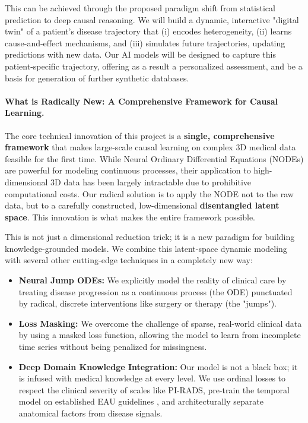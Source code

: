 \documentclass[11pt, a4paper]{article}
\begin{document}
This can be achieved through  the proposed paradigm shift from statistical prediction to deep causal reasoning. We will build a dynamic, interactive "digital twin" of a patient’s disease trajectory that (i) encodes heterogeneity, (ii) learns cause-and-effect mechanisms, and (iii) simulates future trajectories, updating predictions with new data. Our AI models will be designed to capture this patient-specific trajectory, offering as a result a personalized assessment, and be a basis for generation of further synthetic databases.


\paragraph{What is Radically New: A Comprehensive Framework for Causal Learning.}
The core technical innovation of this project is a \textbf{single, comprehensive framework} that makes large-scale causal learning on complex 3D medical data feasible for the first time. While Neural Ordinary Differential Equations (NODEs) are powerful for modeling continuous processes, their application to high-dimensional 3D data has been largely intractable due to prohibitive computational costs. Our radical solution is to apply the NODE not to the raw data, but to a carefully constructed, low-dimensional \textbf{disentangled latent space}. This innovation is what makes the entire framework possible.

This is not just a dimensional reduction trick; it is a new paradigm for building knowledge-grounded models. We combine this latent-space dynamic modeling with several other cutting-edge techniques in a completely new way:
\begin{itemize}
    \item \textbf{Neural Jump ODEs:} We explicitly model the reality of clinical care by treating disease progression as a continuous process (the ODE) punctuated by radical, discrete interventions like surgery or therapy (the "jumps").
    \item \textbf{Loss Masking:} We overcome the challenge of sparse, real-world clinical data by using a masked loss function, allowing the model to learn from incomplete time series without being penalized for missingness.
    \item \textbf{Deep Domain Knowledge Integration:} Our model is not a black box; it is infused with medical knowledge at every level. We use ordinal losses to respect the clinical severity of scales like PI-RADS, pre-train the temporal model on established EAU guidelines \cite{guidelines_uro_1,guidelines_uro_2}, and architecturally separate anatomical factors from disease signals.
\end{itemize}
\end{document}
